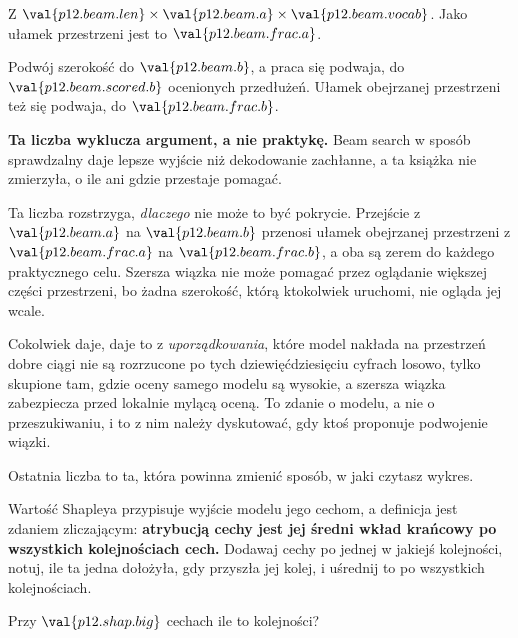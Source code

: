 \begin{fr}
Z $\val{p12.beam.len} \times \val{p12.beam.a} \times \val{p12.beam.vocab}$.
Jako ułamek przestrzeni jest to $\val{p12.beam.frac.a}$.

Podwój szerokość do $\val{p12.beam.b}$, a praca się podwaja, do
$\val{p12.beam.scored.b}$ ocenionych przedłużeń. Ułamek obejrzanej przestrzeni
też się podwaja, do $\val{p12.beam.frac.b}$.

\begin{warning}
\textbf{Ta liczba wyklucza argument, a nie praktykę.} Beam search w sposób
sprawdzalny daje lepsze wyjście niż dekodowanie zachłanne, a ta książka nie
zmierzyła, o ile ani gdzie przestaje pomagać.

Ta liczba rozstrzyga, \emph{dlaczego} nie może to być pokrycie. Przejście z
$\val{p12.beam.a}$ na $\val{p12.beam.b}$ przenosi ułamek obejrzanej
przestrzeni z $\val{p12.beam.frac.a}$ na $\val{p12.beam.frac.b}$, a oba są
zerem do każdego praktycznego celu. Szersza wiązka nie może pomagać przez
oglądanie większej części przestrzeni, bo żadna szerokość, którą ktokolwiek
uruchomi, nie ogląda jej wcale.

Cokolwiek daje, daje to z \emph{uporządkowania}, które model nakłada na
przestrzeń \dash{} dobre ciągi nie są rozrzucone po tych dziewięćdziesięciu
cyfrach losowo, tylko skupione tam, gdzie oceny samego modelu są wysokie, a
szersza wiązka zabezpiecza przed lokalnie mylącą oceną. To zdanie o modelu, a
nie o przeszukiwaniu, i to z nim należy dyskutować, gdy ktoś proponuje
podwojenie wiązki.
\end{warning}
\end{fr}

\begin{fr}
Ostatnia liczba to ta, która powinna zmienić sposób, w jaki czytasz wykres.

Wartość Shapleya przypisuje wyjście modelu jego cechom, a definicja jest
zdaniem zliczającym: \textbf{atrybucją cechy jest jej średni wkład krańcowy po
wszystkich kolejnościach cech.} Dodawaj cechy po jednej w jakiejś kolejności,
notuj, ile ta jedna dołożyła, gdy przyszła jej kolej, i uśrednij to po
wszystkich kolejnościach.

Przy $\val{p12.shap.big}$ cechach ile to kolejności?
\dotline
\nextframe
\end{fr}

